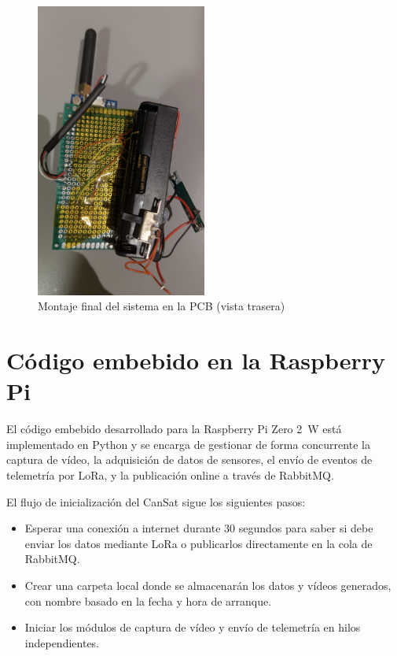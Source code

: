 \begin{figure}[H]
    \centering
    \includegraphics[width=0.5\textwidth]{Imagenes/Bitmap/pcb_montaje_trasero}
    \caption{Montaje final del sistema en la PCB (vista trasera)}
    \label{fig:montaje_trasero}
\end{figure}


\section{Código embebido en la Raspberry Pi}

El código embebido desarrollado para la Raspberry Pi Zero 2~W está implementado en Python y se encarga de gestionar de forma concurrente la captura de vídeo, la adquisición de datos de sensores, el envío de eventos de telemetría por LoRa, y la publicación online a través de RabbitMQ.

El flujo de inicialización del CanSat sigue los siguientes pasos:

\begin{itemize}
    \item Esperar una conexión a internet durante 30 segundos para saber si debe enviar los datos mediante LoRa o publicarlos directamente en la cola de RabbitMQ.
    \item Crear una carpeta local donde se almacenarán los datos y vídeos generados, con nombre basado en la fecha y hora de arranque.
    \item Iniciar los módulos de captura de vídeo y envío de telemetría en hilos independientes.
\end{itemize}

